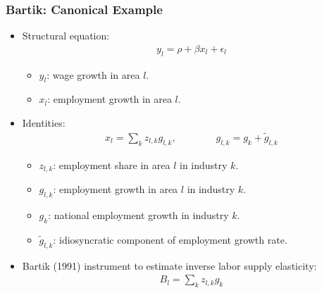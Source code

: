 \documentclass[english,xcolor=svgnames]{beamer}
\begin{document}
\begin{frame}
\frametitle[alignment=center]{Bartik: Canonical Example}
\begin{itemize}
	\item Structural equation:
	\begin{align*}
		y_l = \rho +\beta x_l + \epsilon_l
	\end{align*}
	\begin{itemize}
		\item $y_l$: wage growth in area $l$.
		\item $x_l$: employment growth in area $l$.
	\end{itemize}
	\item Identities:
	\begin{align*}
		x_l = \sum_k z_{l,k} g_{l,k}, \qquad\qquad g_{l,k} = g_k + \tilde{g}_{l,k}
	\end{align*}
	\begin{itemize}
		\item $z_{l,k}$: employment share in area $l$ in industry $k$.
		\item $g_{l,k}$: employment growth in area $l$ in industry $k$.
		\item $g_{k}$: national employment growth in industry $k$.
		\item $\tilde{g}_{l,k}$:  idiosyncratic component of employment growth rate.
	\end{itemize}
	\item Bartik (1991) instrument to estimate inverse labor supply elasticity:
	\begin{align*}
		B_l = \sum_k z_{l,k}g_k
	\end{align*}
\end{itemize}
\end{frame}
\end{document}
